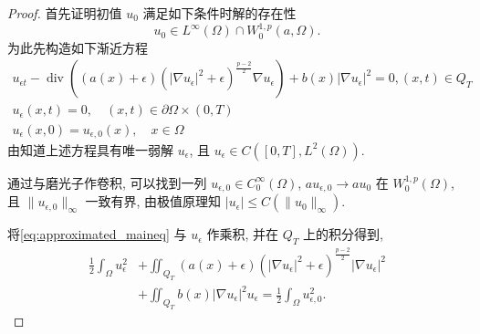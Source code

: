 \documentclass[oneside,longtitle]{LZUthesis}
\numberwithin{equation}{chapter}
\newcommand*\abs[1]{\lvert#1\rvert}
\newcommand*\norm[1]{\lVert#1\rVert}
\DeclareMathOperator{\Div}{div}
\begin{document}
\begin{proof}
	首先证明初值 $u_0$ 满足如下条件时解的存在性
	\begin{equation}\label{initial_data_condition_tmp}
		u_0 \in L^{\infty}(\Omega) \cap W_0^{1, p}(a, \Omega).
	\end{equation}
	为此先构造如下渐近方程
	\begin{gather*}
		u_{\epsilon t}-\Div\left((a(x)+\epsilon)
		\left(\left|\nabla u_{\epsilon}\right|^{2}+\epsilon\right)^{\frac{p-2}{2}} \nabla u_{\epsilon}\right)
		+b(x)\left|\nabla u_{\epsilon}\right|^{2} = 0,(x, t) \in Q_{T} \label{eq:approximated_maineq} \\
		u_{\epsilon}(x, t)  = 0, \quad(x, t) \in \partial \Omega \times(0, T)\\
		u_{\epsilon}(x, 0)  = u_{\epsilon, 0}(x), \quad x \in \Omega
	\end{gather*}
	由\citep{taylorPartialDifferentialEquations2011}知道上述方程具有唯一弱解 $u_\epsilon$, 且 $u_\epsilon \in C([0, T], L^2(\Omega))$.

	通过与磨光子作卷积,
	可以找到一列 $u_{\epsilon,0} \in C_0^\infty(\Omega) $, $au_{\epsilon,0} \to au_0 $ 在 $W_0^{1,p}(\Omega) $,
	且 $\norm{u_{\epsilon, 0}}_{\infty}$ 一致有界,
	由极值原理知 $\abs{u_{\epsilon}} \leq C(\norm{u_0}_{\infty})$.

	将\cref{eq:approximated_maineq} 与 $u_\epsilon$ 作乘积, 并在 $Q_T$ 上的积分得到,
	\begin{equation}\label{eq:1}
		\begin{split}
			\frac{1}{2} \int_{\Omega} u_{\epsilon}^{2}
			&+\iint_{Q_{T}}(a(x)+\epsilon)\left(\left|\nabla u_{\epsilon}\right|^{2}+\epsilon\right)^{\frac{p-2}{2}}\left|\nabla u_{\epsilon}\right|^{2}\\
			&+\iint_{Q_{T}} b(x)\left|\nabla u_{\epsilon}\right|^{2} u_{\epsilon}  =\frac{1}{2} \int_{\Omega} u_{\epsilon, 0}^{2}.
		\end{split}
	\end{equation}


\end{proof}
\end{document}
